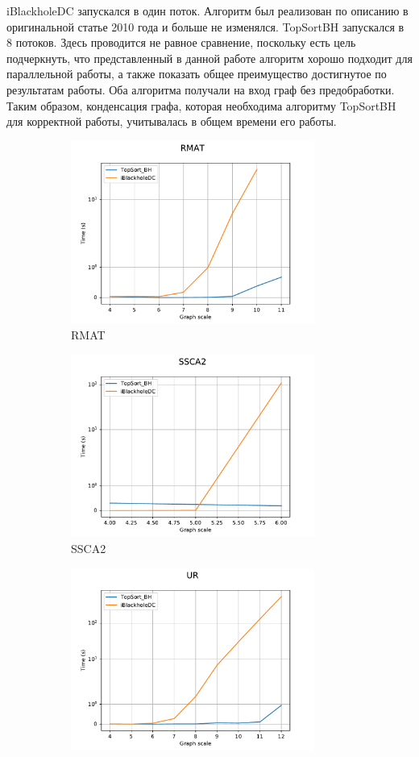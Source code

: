 \documentclass[12pt,a4paper,oneside,openany]{article}
\theoremstyle{definition}
\theoremstyle{lemma}
\theoremstyle{remark}
\begin{document}
iBlackholeDC запускался в один поток. Алгоритм был реализован по описанию в оригинальной статье 2010
года и больше не изменялся.
TopSortBH запускался в 8 потоков. Здесь проводится не равное сравнение, поскольку
есть цель подчеркнуть, что представленный в данной работе алгоритм хорошо подходит для параллельной работы, а также
показать общее преимущество достигнутое по результатам работы.
Оба алгоритма получали на вход граф без предобработки. Таким образом, конденсация графа,
которая необходима алгоритму TopSortBH для корректной работы, учитывалась в общем времени его работы.

\begin{figure}[H]
    \begin{subfigure}{.5\textwidth}
      \centering
      \includegraphics[width=8cm]{images/1_RMAT.pdf}
      \caption{RMAT}
      \label{fig:vanilla:rmat}
    \end{subfigure}
    \begin{subfigure}{.5\textwidth}
      \centering
      \includegraphics[width=8cm]{images/1_SSCA2.pdf}
      \caption{SSCA2}
      \label{fig:vanilla:ssca}
    \end{subfigure}
    \begin{subfigure}{.5\textwidth}
      \centering
      \includegraphics[width=8cm]{images/1_UR.pdf}

\end{subfigure}
\end{figure}
\end{document}
